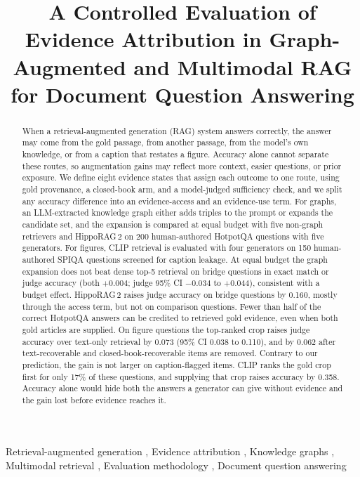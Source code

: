 \documentclass[preprint,12pt]{elsarticle}
\begin{document}
\begin{frontmatter}

\title{A Controlled Evaluation of Evidence Attribution in Graph-Augmented and Multimodal RAG for Document Question Answering}


\begin{abstract}
When a retrieval-augmented generation (RAG) system answers correctly, the
answer may come from the gold passage, from another passage, from the model's
own knowledge, or from a caption that restates a figure. Accuracy alone cannot
separate these routes, so augmentation gains may reflect more context, easier
questions, or prior exposure. We define eight evidence states that assign each
outcome to one route, using gold provenance, a closed-book arm, and a
model-judged sufficiency check, and we split any accuracy difference into an
evidence-access and an evidence-use term. For graphs, an LLM-extracted
knowledge graph either adds triples to the prompt or expands the candidate
set, and the expansion is compared at equal budget with five non-graph
retrievers and HippoRAG\,2 on 200 human-authored HotpotQA questions with five
generators. For figures, CLIP retrieval is evaluated with four generators on 150
human-authored SPIQA questions screened for caption leakage. At equal budget the graph
expansion does not beat dense top-5 retrieval on bridge questions in exact
match or judge accuracy (both $+0.004$; judge 95\% CI $-0.034$ to $+0.044$),
consistent with a budget effect. HippoRAG\,2 raises judge accuracy on bridge
questions by 0.160, mostly through the access term, but not on comparison
questions. Fewer than half of the correct HotpotQA answers can be credited to
retrieved gold evidence, even when both gold articles are supplied. On figure
questions the top-ranked crop raises judge accuracy over text-only retrieval by
0.073 (95\% CI 0.038 to 0.110), and by 0.062 after text-recoverable and
closed-book-recoverable items are removed. Contrary to our prediction, the gain
is not larger on caption-flagged items. CLIP ranks the gold crop first for only
17\% of these questions, and supplying that crop raises accuracy by 0.358.
Accuracy alone would hide both the answers a generator can give without
evidence and the gain lost before evidence reaches it.

\end{abstract}

\begin{keyword}
Retrieval-augmented generation \sep
Evidence attribution \sep
Knowledge graphs \sep
Multimodal retrieval \sep
Evaluation methodology \sep
Document question answering
\end{keyword}
\end{frontmatter}
\end{document}
